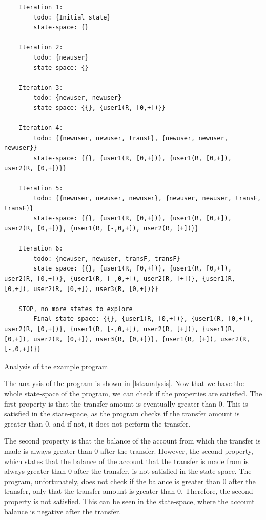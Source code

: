 \begin{listing}[htb!]
    \begin{verbatim}
    Iteration 1:
        todo: {Initial state}
        state-space: {}

    Iteration 2:
        todo: {newuser}
        state-space: {}

    Iteration 3:
        todo: {newuser, newuser}
        state-space: {{}, {user1(R, [0,+])}}

    Iteration 4:
        todo: {{newuser, newuser, transF}, {newuser, newuser, newuser}}
        state-space: {{}, {user1(R, [0,+])}, {user1(R, [0,+]), user2(R, [0,+])}}

    Iteration 5:
        todo: {{newuser, newuser, newuser}, {newuser, newuser, transF, transF}}
        state-space: {{}, {user1(R, [0,+])}, {user1(R, [0,+]), user2(R, [0,+])}, {user1(R, [-,0,+]), user2(R, [+])}}

    Iteration 6:
        todo: {newuser, newuser, transF, transF}
        state space: {{}, {user1(R, [0,+])}, {user1(R, [0,+]), user2(R, [0,+])}, {user1(R, [-,0,+]), user2(R, [+])}, {user1(R, [0,+]), user2(R, [0,+]), user3(R, [0,+])}}

    STOP, no more states to explore
        Final state-space: {{}, {user1(R, [0,+])}, {user1(R, [0,+]), user2(R, [0,+])}, {user1(R, [-,0,+]), user2(R, [+])}, {user1(R, [0,+]), user2(R, [0,+]), user3(R, [0,+])}, {user1(R, [+]), user2(R, [-,0,+])}}
    \end{verbatim}
\caption{Analysis of the example program}
\label{lst:analysis}
\end{listing}


The analysis of the program is shown in \autoref{lst:analysis}.
Now that we have the whole state-space of the program, we can check if the properties are satisfied.
The first property is that the transfer amount is eventually greater than 0.
This is satisfied in the state-space, as the program checks if the transfer amount is greater than 0, and if not, it does not perform the transfer.

The second property is that the balance of the account from which the transfer is made is always greater than 0 after the transfer.
However, the second property, which states that the balance of the account that the transfer is made from is always greater than 0 after the transfer, is not satisfied in the state-space.
The program, unfortunately, does not check if the balance is greater than 0 after the transfer, only that the transfer amount is greater than 0.
Therefore, the second property is not satisfied.
This can be seen in the state-space, where the account balance is negative after the transfer.
